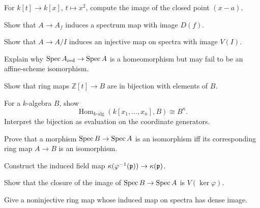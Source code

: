 \begin{exercise}\label{ex:vi19-11}
For $k[t]\to k[x]$, $t\mapsto x^2$, compute the image of the closed point $(x-a)$.
\end{exercise}

\begin{exercise}\label{ex:vi19-12}
Show that $A\to A_f$ induces a spectrum map with image $D(f)$.
\end{exercise}

\begin{exercise}\label{ex:vi19-13}
Show that $A\to A/I$ induces an injective map on spectra with image $V(I)$.
\end{exercise}

\begin{exercise}\label{ex:vi19-14}
Explain why $\operatorname{Spec} A_{\mathrm{red}}\to\operatorname{Spec} A$ is a homeomorphism but may fail to be an affine-scheme isomorphism.
\end{exercise}

\begin{exercise}\label{ex:vi19-15}
Show that ring maps $\mathbb Z[t]\to B$ are in bijection with elements of $B$.
\end{exercise}

\begin{exercise}\label{ex:vi19-16}
For a $k$-algebra $B$, show
\[
\operatorname{Hom}_{k\text{-alg}}(k[x_1,\dots,x_n],B)\cong B^n.
\]
Interpret the bijection as evaluation on the coordinate generators.
\end{exercise}

\begin{exercise}\label{ex:vi19-17}
Prove that a morphism $\operatorname{Spec} B\to\operatorname{Spec} A$ is an isomorphism iff its corresponding ring map $A\to B$ is an isomorphism.
\end{exercise}

\begin{exercise}\label{ex:vi19-18}
Construct the induced field map $\kappa(\varphi^{-1}(\mathfrak p))\to\kappa(\mathfrak p)$.
\end{exercise}

\begin{exercise}\label{ex:vi19-19}
Show that the closure of the image of $\operatorname{Spec} B\to\operatorname{Spec} A$ is $V(\ker\varphi)$.
\end{exercise}

\begin{exercise}\label{ex:vi19-20}
Give a noninjective ring map whose induced map on spectra has dense image.
\end{exercise}

